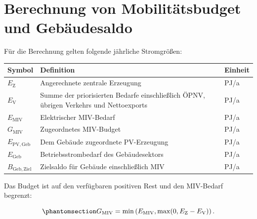\documentclass[
  ngerman,
  a4paper,
  DIV=11]{scrreprt}
\newcounter{none} %
\begin{document}
\section{Berechnung von Mobilitätsbudget und
Gebäudesaldo}\label{sec-allokation-miv}

Für die Berechnung gelten folgende jährliche Stromgrößen:

{\def\LTcaptype{none} %
\begin{longtable}[]{@{}
  >{\raggedright\arraybackslash}p{}
  >{\raggedright\arraybackslash}p{}
  >{\raggedright\arraybackslash}p{}@{}}
\toprule\noalign{}
\begin{minipage}[b]{\linewidth}\raggedright
Symbol
\end{minipage} & \begin{minipage}[b]{\linewidth}\raggedright
Definition
\end{minipage} & \begin{minipage}[b]{\linewidth}\raggedright
Einheit
\end{minipage} \\
\midrule\noalign{}
\endhead
\bottomrule\noalign{}
\endlastfoot
\(E_{\mathrm{Z}}\) & Angerechnete zentrale Erzeugung & PJ/a \\
\(E_{\mathrm{V}}\) & Summe der priorisierten Bedarfe einschließlich
ÖPNV, übrigen Verkehrs und Nettoexports & PJ/a \\
\(E_{\mathrm{MIV}}\) & Elektrischer MIV-Bedarf & PJ/a \\
\(G_{\mathrm{MIV}}\) & Zugeordnetes MIV-Budget & PJ/a \\
\(E_{\mathrm{PV,Geb}}\) & Dem Gebäude zugeordnete PV-Erzeugung & PJ/a \\
\(E_{\mathrm{Geb}}\) & Betriebsstrombedarf des Gebäudesektors & PJ/a \\
\(B_{\mathrm{Geb,Ziel}}\) & Zielsaldo für Gebäude einschließlich MIV &
PJ/a \\
\end{longtable}
}

Das Budget ist auf den verfügbaren positiven Rest und den MIV-Bedarf
begrenzt:

\begin{equation}\protect\phantomsection\label{eq-miv-restbudget}{
G_{\mathrm{MIV}}=\min\left(E_{\mathrm{MIV}},\max(0,E_{\mathrm{Z}}-E_{\mathrm{V}})\right).
}\end{equation}
\end{document}
